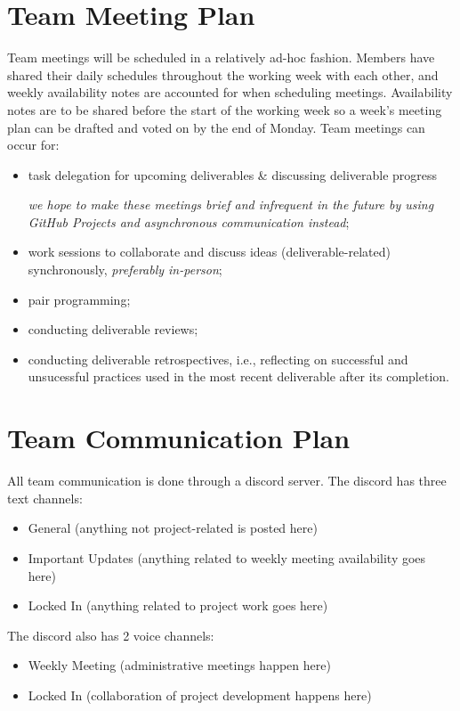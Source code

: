 \documentclass{article}
\begin{document}
\section{Team Meeting Plan}
Team meetings will be scheduled in a relatively ad-hoc fashion. Members have shared their daily schedules throughout the working week with each other, and weekly availability notes are accounted for when scheduling meetings. Availability notes are to be shared before the start of the working week so a week's meeting plan can be drafted and voted on by the end of Monday. Team meetings can occur for:
\begin{itemize}
  \item task delegation for upcoming deliverables \& discussing deliverable progress
  
  \emph{we hope to make these meetings brief and infrequent in the future by using GitHub Projects and asynchronous communication instead};
  \item work sessions to collaborate and discuss ideas (deliverable-related) synchronously, \emph{preferably in-person};
  \item pair programming;
  \item conducting deliverable reviews;
  \item conducting deliverable retrospectives, i.e., reflecting on successful and unsucessful practices used in the most recent deliverable after its completion.
\end{itemize}


\section{Team Communication Plan}
All team communication is done through a discord server. The discord has three text channels:
\begin{itemize}
  \item General (anything not project-related is posted here)
  \item Important Updates (anything related to weekly meeting availability goes here)
  \item Locked In (anything related to project work goes here)
\end{itemize}
\noindent
The discord also has 2 voice channels:

\begin{itemize}
  \item Weekly Meeting (administrative meetings happen here)
  \item Locked In (collaboration of project development happens here)
\end{itemize}
\end{document}
